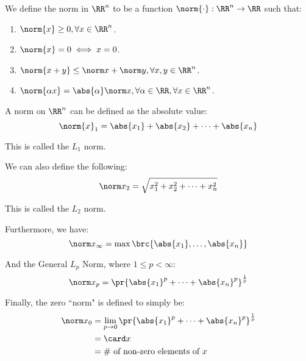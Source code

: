 \documentclass[openany]{book}
\begin{document}
\begin{defn}[Norm]
	We define the norm in $\RR^{n}$ to be a function $\norm{\cdot} : \RR^{n} \rightarrow \RR$ such that:
	\begin{enumerate}
		\item $\norm{x} \geq 0, \forall x \in \RR^{n}$.
		\item $\norm{x} = 0 \iff x = 0$.
		\item $\norm{x+y} \leq \norm x + \norm y, \forall x,y \in \RR^{n}$.
		\item $\norm{\alpha x} = \abs{\alpha} \norm x, \forall \alpha \in \RR, \forall x \in \RR^{n}$.
	\end{enumerate}
\end{defn}
\begin{example}
	A norm on $\RR^{n}$ can be defined as the absolute value:
	\begin{equation*}
		\norm{x}_1 = \abs{x_1} + \abs{x_2} + \cdots + \abs{x_n}
	\end{equation*}

	This is called the $L_1$ norm.
	
	We can also define the following:
	\begin{equation*}
		\norm x_2 = \sqrt{x_1^{2} + x_2^{2} + \cdots + x_n^{2}}
	\end{equation*}

	This is called the $L_2$ norm.
	
	Furthermore, we have:
	\begin{equation*}
		\norm x_\infty = \max\brc{\abs{x_1}, \ldots, \abs{x_n}}
	\end{equation*}

	And the General $L_p$ Norm, where $1 \leq p < \infty$:
	\begin{equation*}
		\norm x_p = \pr{ \abs{x_1}^{p} + \cdots + \abs{x_n}^{p}}^{\frac{1}{p}}
	\end{equation*}

	Finally, the zero ``norm" is defined to simply be:
	\begin{align*}
		\norm x_0 &= \lim_{p \rightarrow 0} \pr{ \abs{x_1}^{p} + \cdots + \abs{x_n}^{p}}^{\frac{1}{p}} \\
		&= \card x \\
		&= \text{\# of non-zero elements of $x$}
	\end{align*}
\end{example}
\end{document}
